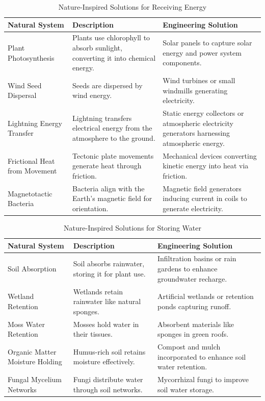 \documentclass[12pt]{article}
\begin{document}
\begin{table}[h!]
    \centering
    \caption{Nature-Inspired Solutions for Receiving Energy}
    \begin{tabular}{p{4cm} p{5.5cm} p{5.5cm}}
        \toprule
        \textbf{Natural System} & \textbf{Description} & \textbf{Engineering Solution} \\
        \midrule
        Plant Photosynthesis & Plants use chlorophyll to absorb sunlight, converting it into chemical energy. & Solar panels to capture solar energy and power system components. \\
        Wind Seed Dispersal & Seeds are dispersed by wind energy. & Wind turbines or small windmills generating electricity. \\
        Lightning Energy Transfer & Lightning transfers electrical energy from the atmosphere to the ground. & Static energy collectors or atmospheric electricity generators harnessing atmospheric energy. \\
        Frictional Heat from Movement & Tectonic plate movements generate heat through friction. & Mechanical devices converting kinetic energy into heat via friction. \\
        Magnetotactic Bacteria & Bacteria align with the Earth's magnetic field for orientation. & Magnetic field generators inducing current in coils to generate electricity. \\
        \bottomrule
    \end{tabular}
    \label{tab:receives_energy}
\end{table}

\begin{table}[h!]
    \centering
    \caption{Nature-Inspired Solutions for Storing Water}
    \begin{tabular}{p{4cm} p{5.5cm} p{5.5cm}}
        \toprule
        \textbf{Natural System} & \textbf{Description} & \textbf{Engineering Solution} \\
        \midrule
        Soil Absorption & Soil absorbs rainwater, storing it for plant use. & Infiltration basins or rain gardens to enhance groundwater recharge. \\
        Wetland Retention & Wetlands retain rainwater like natural sponges. & Artificial wetlands or retention ponds capturing runoff. \\
        Moss Water Retention & Mosses hold water in their tissues. & Absorbent materials like sponges in green roofs. \\
        Organic Matter Moisture Holding & Humus-rich soil retains moisture effectively. & Compost and mulch incorporated to enhance soil water retention. \\
        Fungal Mycelium Networks & Fungi distribute water through soil networks. & Mycorrhizal fungi to improve soil water storage. \\
        \bottomrule
    \end{tabular}
    \label{tab:stores_water}
\end{table}
\end{document}
